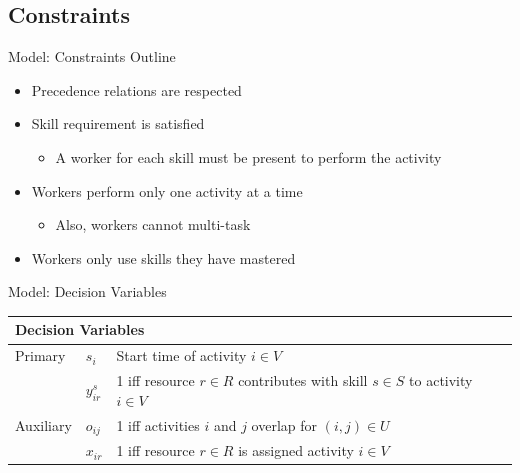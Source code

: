 \documentclass{beamer}
\begin{document}
\subsection{Constraints}
\begin{frame}{Model: Constraints Outline}
	\begin{itemize}
		\item Precedence relations are respected\pause
		\vspace{2mm}
		\item Skill requirement is satisfied
		\begin{itemize}
			\item A worker for each skill must be present to perform the activity\pause
		\end{itemize}
		\vspace{2mm}
		\item Workers perform only one activity at a time
		\begin{itemize}
			\item Also, workers cannot multi-task\pause
		\end{itemize}
		\vspace{2mm}
		\item Workers only use skills they have mastered
	\end{itemize}
\end{frame}

\begin{frame}{Model: Decision Variables}
	\begin{adjustwidth}{-.9in}{-.9in}
	\begin{table}[h]
		\centering
		\vspace{1mm}
		\begin{tabular}{llp{8cm}}
			\toprule
			\multicolumn{3}{l}{ \bf{Decision Variables}}  \\
			\midrule\midrule
			Primary & $s_i$ & Start time of activity $i \in V$ \\
			 & $y_{ir}^s$ & 1 iff resource $r \in R$ contributes with skill $s \in S$ to activity $i \in V$\\\midrule\pause
			Auxiliary & $o_{ij}$ & 1 iff activities $i$ and $j$ overlap for $(i,j)\in U$ \\
			 & $x_{ir}$ & 1 iff resource $r \in R$ is assigned activity $i \in V$ \\
			\bottomrule
		\end{tabular}
		\label{tab:vars}
	\end{table}
	\end{adjustwidth}
\end{frame}
\end{document}
